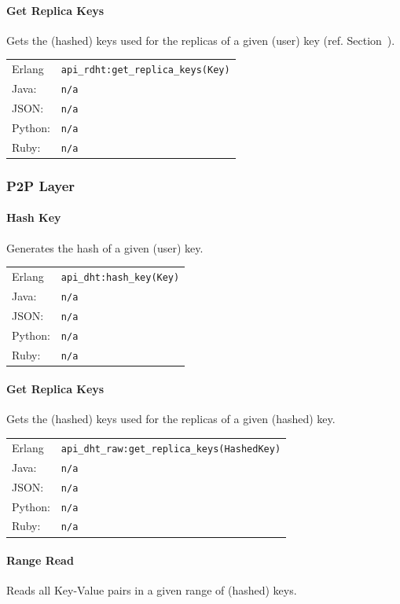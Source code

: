 \documentclass[a4paper]{scrreprt}
\newcommand{\code}[1]{\lstinline[basicstyle=\ttfamily]!#1!}
\begin{document}
\paragraph{Get Replica Keys}
Gets the (hashed) keys used for the replicas of a given (user) key
(ref. Section~).

\begin{tabular}{lp{14cm}}
Erlang  & \code{api_rdht:get_replica_keys(Key)}\\
Java:   & \code{n/a}\\
JSON:   & \code{n/a}\\
Python: & \code{n/a}\\
Ruby:   & \code{n/a}
\end{tabular}

\subsubsection{P2P Layer}
\label{sec:apis.ops.p2player}

\paragraph{Hash Key}
Generates the hash of a given (user) key.

\begin{tabular}{lp{14cm}}
Erlang  & \code{api_dht:hash_key(Key)}\\
Java:   & \code{n/a}\\
JSON:   & \code{n/a}\\
Python: & \code{n/a}\\
Ruby:   & \code{n/a}
\end{tabular}

\paragraph{Get Replica Keys}
Gets the (hashed) keys used for the replicas of a given (hashed) key.

\begin{tabular}{lp{14cm}}
Erlang  & \code{api_dht_raw:get_replica_keys(HashedKey)}\\
Java:   & \code{n/a}\\
JSON:   & \code{n/a}\\
Python: & \code{n/a}\\
Ruby:   & \code{n/a}
\end{tabular}

\paragraph{Range Read}
Reads all Key-Value pairs in a given range of (hashed) keys.
\end{document}
